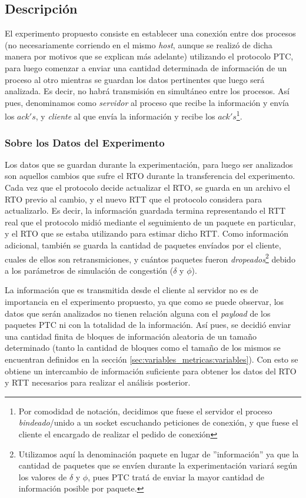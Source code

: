 \subsection{Descripci\'on}\label{sec:experimento:descripcion}
\par El experimento propuesto consiste en establecer una conexi\'on entre dos
procesos (no necesariamente corriendo en el mismo \textit{host}, aunque se
realiz\'o de dicha manera por motivos que se explican m\'as adelante) utilizando
el protocolo PTC, para luego comenzar a enviar una cantidad determinada de
informaci\'on de un proceso al otro mientras se guardan los datos pertinentes
que luego ser\'a analizada. Es decir, no habr\'a transmisi\'on en simult\'aneo
entre los procesos. As\'i pues, denominamos como \emph{servidor} al proceso que
recibe la informaci\'on y env\'ia los $ack's$, y \emph{cliente} al que env\'ia
la informaci\'on y recibe los $ack's$\footnote{Por comodidad de notaci\'on,
decidimos que fuese el servidor el proceso \textit{bindeado}/unido a un socket
escuchando peticiones de conexi\'on, y que fuese el cliente el encargado de
realizar el pedido de conexi\'on}.

\subsubsection*{Sobre los Datos del Experimento}
\par Los datos que se guardan durante la experimentaci\'on, para luego ser
analizados son aquellos cambios que sufre el RTO durante la transferencia del
experimento. Cada vez que el protocolo decide actualizar el RTO, se guarda en un
archivo el RTO previo al cambio, y el nuevo RTT que el protocolo considera para
actualizarlo. Es decir, la informaci\'on guardada termina representando el RTT
real que el protocolo midi\'o mediante el seguimiento de un paquete en
particular, y el RTO que se estaba utilizando para estimar dicho RTT. Como
informaci\'on adicional, tambi\'en se guarda la cantidad de paquetes env\'iados
por el cliente, cuales de ellos son retransmiciones, y cu\'antos paquetes fueron
\emph{dropeados}\footnote{Utilizamos aqu\'i la denominaci\'on paquete en lugar
de ''informaci\'on'' ya que la cantidad de paquetes que se env\'ien durante la
experimentaci\'on variar\'a seg\'un los valores de $\delta$ y $\phi$, pues PTC
trat\'a de enviar la mayor cantidad de informaci\'on posible por paquete.}
debido a los par\'ametros de simulaci\'on de congesti\'on ($\delta$ y $\phi$).

\par La informaci\'on que es transmitida desde el cliente al servidor no es de
importancia en el experimento propuesto, ya que como se puede observar, los
datos que ser\'an analizados no tienen relaci\'on alguna con el \emph{payload}
de los paquetes PTC ni con la totalidad de la informaci\'on. As\'i pues, se
decidi\'o enviar una cantidad finita de bloques de informaci\'on aleatoria de un
tama\~no determinado (tanto la cantidad de bloques como el tama\~no de los
mismos se encuentran definidos en la secci\'on
\ref{sec:variables_metricas:variables}). Con esto se obtiene un intercambio de
informaci\'on suficiente para obtener los datos del RTO y RTT necesarios para
realizar el an\'alisis posterior.

